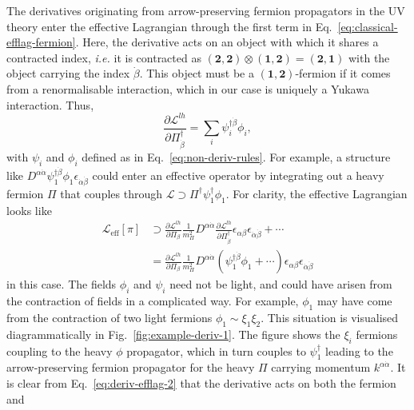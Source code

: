 The derivatives originating from arrow-preserving fermion propagators in the UV
theory enter the effective Lagrangian through the first term in
Eq.~\eqref{eq:classical-efflag-fermion}. Here, the derivative acts on an object
with which it shares a contracted index, \textit{i.e.} it is contracted as
$(\mathbf{2}, \mathbf{2}) \otimes (\mathbf{1}, \mathbf{2}) = (\mathbf{2}, \mathbf{1})$
with the object carrying the index $\dot{\beta}$. This object must be a
$(\mathbf{1}, \mathbf{2})$-fermion if it comes from a renormalisable
interaction, which in our case is uniquely a Yukawa interaction. Thus,
\begin{equation}
  \label{eq:deriv-indices}
  \frac{\partial \mathscr{L}^{lh}}{\partial \Pi_{\dot{\beta}}^{\dagger}} = \sum_{i} \psi^{\dagger \dot{\beta}}_{i} \phi_{i} ,
\end{equation}
with $\psi_{i}$ and $\phi_{i}$ defined as in Eq.~\eqref{eq:non-deriv-rules}. For
example, a structure like
$D^{\alpha \dot{\alpha}} \psi_{1}^{\dagger \dot{\beta}} \phi_{1} \epsilon_{\dot{\alpha} \dot{\beta}}$
could enter an effective operator by integrating out a heavy fermion $\Pi$ that
couples through $\mathscr{L} \supset \Pi^{\dagger} \psi^{\dagger}_{1} \phi_{1}$.
For clarity, the effective Lagrangian looks like
\begin{align}
  \mathscr{L}_{\text{eff}}[\pi] &\supset \frac{\partial \mathscr{L}^{lh}}{\partial \Pi_{\beta}} \frac{1}{m_{\Pi}^{2}} D^{\alpha \dot{\alpha}} \frac{\partial \mathscr{L}^{lh}}{\partial \Pi^{\dagger}_{\dot{\beta}}}   \epsilon_{\alpha \beta} \epsilon_{\dot{\alpha} \dot{\beta}} + \cdots \\
  &= \frac{\partial \mathscr{L}^{lh}}{\partial \Pi_{\beta}} \frac{1}{m_{\Pi}^{2}} D^{\alpha \dot{\alpha}} \left( \psi_{1}^{\dagger \dot{\beta}} \phi_{1} + \cdots \right) \epsilon_{\alpha \beta} \epsilon_{\dot{\alpha} \dot{\beta}} \label{eq:deriv-efflag-2}
\end{align}
in this case. The fields $\phi_{i}$ and $\psi_{i}$ need not be light, and could
have arisen from the contraction of fields in a complicated way. For example,
$\phi_{1}$ may have come from the contraction of two light fermions
$\phi_{1} \sim \xi_{1} \xi_{2}$. This situation is visualised diagrammatically
in Fig.~\ref{fig:example-deriv-1}. The figure shows the $\xi_{i}$ fermions
coupling to the heavy $\phi$ propagator, which in turn couples to
$\psi_{1}^{\dagger}$ leading to the arrow-preserving fermion propagator for the
heavy $\Pi$ carrying momentum $k^{\alpha \dot{\alpha}}$. It is clear from
Eq.~\eqref{eq:deriv-efflag-2} that the derivative acts on both the fermion and
